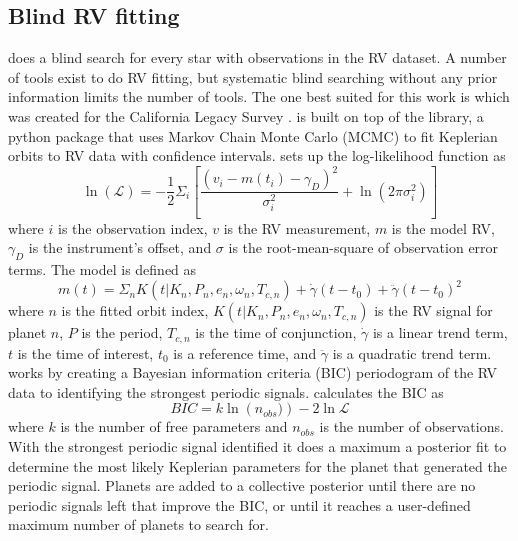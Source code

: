 \subsection{Blind RV fitting}

 does a blind search for every star with observations in the
RV dataset. A number of tools exist to do RV fitting, but systematic blind
searching without any prior information limits the number of tools. The one
best suited for this work is  which was created for the
California Legacy Survey \citep{rosenthalCaliforniaLegacy2021}. 
is built on top of the 
library\citep{fultonRadvelRadialVelocity2018}, a python package that uses
Markov Chain Monte Carlo (MCMC) to fit Keplerian orbits to RV data
with confidence intervals.  sets up the log-likelihood function
as \citep{rosenthalCaliforniaLegacy2021} 
\begin{equation}
\ln(\mathcal{L}) = -\frac{1}{2}
\Sigma_i \left[ \frac{\left(v_i - m(t_i) - \gamma_D\right)^2}{\sigma_i^2} +
\ln\left(2 \pi \sigma_i^2\right)\right]
  \label{eq:likelihoodfun}
\end{equation}
where $i$ is the observation index,
$v$ is the RV measurement, $m$ is the model RV, $\gamma_D$ is the instrument's
offset, and $\sigma$ is the root-mean-square of observation error terms. The
model is defined as 
\begin{equation}
m(t) = \Sigma_n K(t|K_n,P_n,e_n,\omega_n,T_{c,n}) +
\dot{\gamma}(t-t_0) + \ddot{\gamma}(t-t_0)^2
  \label{eq:rv_model}
\end{equation}
where $n$ is the fitted orbit
index, $K(t|K_n,P_n,e_n,\omega_n,T_{c,n})$ is the RV signal for planet $n$, $P$
is the period, $T_{c,n}$ is the time of conjunction, $\dot{\gamma}$ is a linear
trend term, $t$ is the time of interest, $t_0$ is a reference time, and
$\ddot{\gamma}$ is a quadratic trend term.  works by creating a
Bayesian information criteria (BIC) periodogram of the RV data to identifying
the strongest periodic signals.  calculates the BIC as 
\begin{equation}
BIC = k
\ln\left(n_{obs})\right) - 2\ln{\mathcal{L}}
  \label{eq:bic}
\end{equation}
where $k$ is the number of free parameters and $n_{obs}$ is the number of
observations. With the strongest periodic signal identified it does a maximum a
posterior fit to determine the most likely Keplerian parameters for the planet
that generated the periodic signal. Planets are added to a collective posterior
until there are no periodic signals left that improve the BIC, or until it
reaches a user-defined maximum number of planets to search for.

